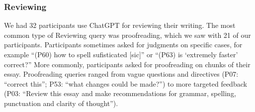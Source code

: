\documentclass[manuscript,screen,acmsmall]{acmart}
\begin{document}
    \subsubsection{Reviewing}
    We had 32 participants use ChatGPT for reviewing their writing.
    The most common type of Reviewing query was proofreading, which we saw with 21 of our participants.
    Participants sometimes asked for judgments on specific cases, for example ``(P60) how to spell sufisticated [sic]'' or ``(P63) is `extremely faster' correct?''
    More commonly, participants asked for proofreading on chunks of their essay.
    Proofreading queries ranged from vague questions and directives (P07: ``correct this''; P53: ``what changes could be made?'') to more targeted feedback (P03: ``Review this essay and make recommendations for grammar, spelling, punctuation and clarity of thought'').
 
\end{document}
